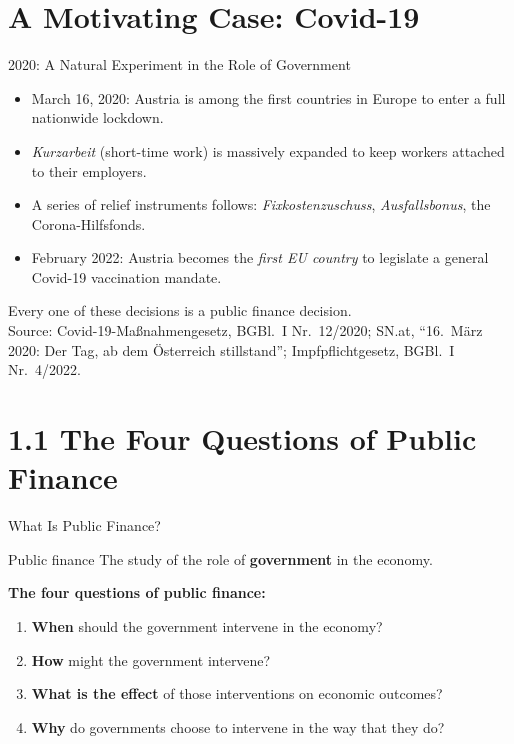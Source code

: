 \documentclass[11pt,aspectratio=169]{beamer}
\newcommand{\srcnote}[1]{{\footnotesize\color{wugray}Source: #1}}
\begin{document}
\section{A Motivating Case: Covid-19}

\begin{frame}{2020: A Natural Experiment in the Role of Government}
  \begin{itemize}
    \item March 16, 2020: Austria is among the first countries in Europe to enter a full nationwide lockdown.
    \item \emph{Kurzarbeit} (short-time work) is massively expanded to keep workers attached to their employers.
    \item A series of relief instruments follows: \emph{Fixkostenzuschuss}, \emph{Ausfallsbonus}, the Corona-Hilfsfonds.
    \item February 2022: Austria becomes the \emph{first EU country} to legislate a general Covid-19 vaccination mandate.
  \end{itemize}
  \vspace{0.5em}
  \centering
  \alert{Every one of these decisions is a public finance decision.}\\
  \srcnote{Covid-19-Maßnahmengesetz, BGBl.\ I Nr.\ 12/2020; SN.at, ``16.\ März 2020: Der Tag, ab dem Österreich stillstand''; Impfpflichtgesetz, BGBl.\ I Nr.\ 4/2022.}
\end{frame}

\section{1.1 The Four Questions of Public Finance}

\begin{frame}{What Is Public Finance?}
  \begin{block}{Public finance}
    The study of the role of \textbf{government} in the economy.
  \end{block}
  \vspace{1em}
  \textbf{The four questions of public finance:}
  \begin{enumerate}
    \item \textbf{When} should the government intervene in the economy?
    \item \textbf{How} might the government intervene?
    \item \textbf{What is the effect} of those interventions on economic outcomes?
    \item \textbf{Why} do governments choose to intervene in the way that they do?
  \end{enumerate}
\end{frame}
\end{document}
